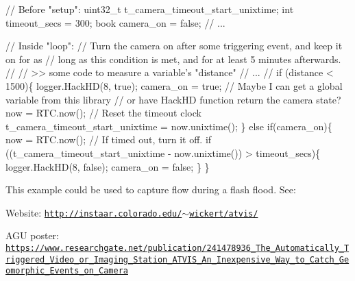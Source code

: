 \begin{DoxyCode}
\textcolor{comment}{// Before "setup":}
uint32\_t t\_camera\_timeout\_start\_unixtime;
\textcolor{keywordtype}{int} timeout\_secs = 300;
book camera\_on = \textcolor{keyword}{false};
\textcolor{comment}{// ...}

\textcolor{comment}{// Inside "loop":}
\textcolor{comment}{// Turn the camera on after some triggering event, and keep it on for as }
\textcolor{comment}{// long as this condition is met, and for at least 5 minutes afterwards.}
\textcolor{comment}{// }
\textcolor{comment}{// >> some code to measure a variable's "distance"}
\textcolor{comment}{// ...}
\textcolor{comment}{// }
\textcolor{keywordflow}{if} (distance < 1500)\{
  logger.HackHD(8, \textcolor{keyword}{true});
  camera\_on = \textcolor{keyword}{true}; \textcolor{comment}{// Maybe I can get a global variable from this library}
                    \textcolor{comment}{// or have HackHD function return the camera state?}
  now = RTC.now();
  \textcolor{comment}{// Reset the timeout clock}
  t\_camera\_timeout\_start\_unixtime = now.unixtime(); 
\}
\textcolor{keywordflow}{else} \textcolor{keywordflow}{if}(camera\_on)\{
  now = RTC.now();
  \textcolor{comment}{// If timed out, turn it off.}
  \textcolor{keywordflow}{if} ((t\_camera\_timeout\_start\_unixtime - now.unixtime()) > timeout\_secs)\{
    logger.HackHD(8, \textcolor{keyword}{false});
    camera\_on = \textcolor{keyword}{false};
  \}
\}
\end{DoxyCode}


This example could be used to capture flow during a flash flood. See\+:
\begin{DoxyItemize}
\item Website\+: \href{http://instaar.colorado.edu/~wickert/atvis/}{\tt http\+://instaar.\+colorado.\+edu/$\sim$wickert/atvis/}
\item A\+GU poster\+: \href{https://www.researchgate.net/publication/241478936_The_Automatically_Triggered_Video_or_Imaging_Station_ATVIS_An_Inexpensive_Way_to_Catch_Geomorphic_Events_on_Camera}{\tt https\+://www.\+researchgate.\+net/publication/241478936\+\_\+\+The\+\_\+\+Automatically\+\_\+\+Triggered\+\_\+\+Video\+\_\+or\+\_\+\+Imaging\+\_\+\+Station\+\_\+\+A\+T\+V\+I\+S\+\_\+\+An\+\_\+\+Inexpensive\+\_\+\+Way\+\_\+to\+\_\+\+Catch\+\_\+\+Geomorphic\+\_\+\+Events\+\_\+on\+\_\+\+Camera}
\end{DoxyItemize}\mbox{\label{classLogger_a62b74ddb3cf9fdd7dae2394c1b245ed4}} 

